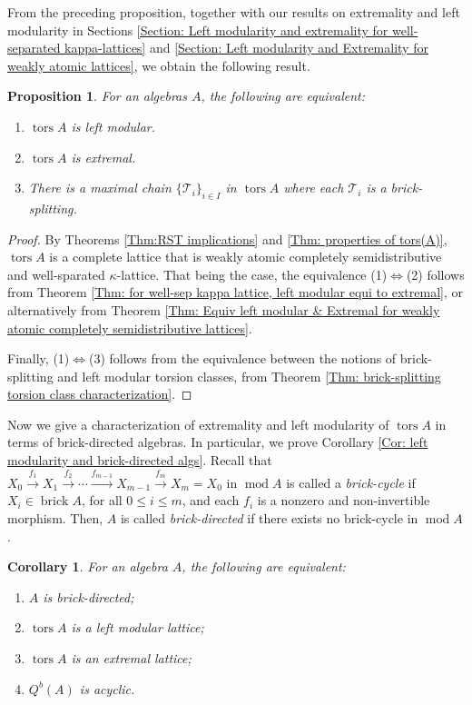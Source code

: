 \documentclass{amsart}
\theoremstyle{thmstyle}
\newtheorem{proposition}[thm]{Proposition}
\newtheorem{corollary}[thm]{Corollary}
\theoremstyle{exstyle}
\theoremstyle{defstyle}
\theoremstyle{remstyle}
\theoremstyle{remstyle}
\DeclareMathOperator*{\modu}{mod}
\DeclareMathOperator*{\brick}{brick}
\DeclareMathOperator*{\tors}{tors}
\begin{document}
From the preceding proposition, together with our results on extremality and left modularity in Sections \ref{Section: Left modularity and extremality for well-separated kappa-lattices} and \ref{Section: Left modularity and Extremality for weakly atomic lattices}, we obtain the following result.

\begin{proposition}\label{Prop: tors A being left modular, extremal, and a chain}
For an algebras $A$, the following are equivalent:
\begin{enumerate}
    \item $\tors A$ is left modular.
    \item $\tors A$ is extremal. 
    \item There is a maximal chain $\{\mathcal{T}_i\}_{i\in I}$ in $\tors A$ where each $\mathcal{T}_i$ is a brick-splitting.
\end{enumerate}
\end{proposition}

\begin{proof}
By Theorems \ref{Thm:RST implications} and \ref{Thm: properties of tors(A)}, $\tors A$ is a complete lattice that is weakly atomic completely semidistributive and well-sparated $\kappa$-lattice. That being the case, the equivalence (1)$\Leftrightarrow$(2) follows from Theorem \ref{Thm: for well-sep kappa lattice, left modular equi to extremal}, or alternatively from Theorem \ref{Thm: Equiv left modular & Extremal for weakly atomic completely semidistributive lattices}. 

Finally, (1)$\Leftrightarrow$(3)
follows from the equivalence between the notions of brick-splitting and left modular torsion classes, from Theorem \ref{Thm: brick-splitting torsion class characterization}.
\end{proof}

Now we give a characterization of extremality and left modularity of $\tors A$ in terms of brick-directed algebras. In particular, we prove Corollary \ref{Cor: left modularity and brick-directed algs}.
Recall that $X_0\xrightarrow{f_1} X_1\xrightarrow{f_2}  \cdots \xrightarrow{f_{m-1}}  X_{m-1}\xrightarrow{f_m}  X_m=X_0$ in $\modu A$ is called a \emph{brick-cycle} if $X_i \in \brick A$, for all $0\leq i\leq m$, and each $f_i$ is a nonzero and non-invertible morphism. Then, $A$ is called \emph{brick-directed} if there exists no brick-cycle in $\modu A$. 

\begin{corollary}
\label{Cor: brick-directed algs and left modularity=extremality}
For an algebra $A$, the following are equivalent:
\begin{enumerate}
    \item $A$ is brick-directed;
    \item $\tors A$ is a left modular lattice;
    \item $\tors A$ is an extremal lattice;
\item $Q^b(A)$ is acyclic.
\end{enumerate}
\end{corollary}
\end{document}
